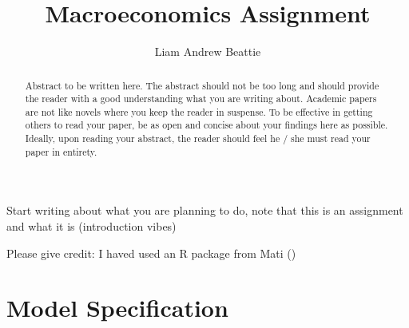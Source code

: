 \documentclass[11pt,preprint]{elsarticle}
\numberwithin{equation}{section}
\numberwithin{figure}{section}
\numberwithin{table}{section}
\begin{document}
\begin{frontmatter}  %

\title{Macroeconomics Assignment}





\author[Add1]{Liam Andrew Beattie}





\address[Add1]{Macroeconomics 871, Stellenbosch University, South
Africa}


\begin{abstract}
\small{
Abstract to be written here. The abstract should not be too long and
should provide the reader with a good understanding what you are writing
about. Academic papers are not like novels where you keep the reader in
suspense. To be effective in getting others to read your paper, be as
open and concise about your findings here as possible. Ideally, upon
reading your abstract, the reader should feel he / she must read your
paper in entirety.
}
\end{abstract}

\vspace{1cm}





\vspace{0.5cm}

\end{frontmatter}

\setcounter{footnote}{0}



\pagestyle{fancy}
\chead{}
\rhead{}
\lfoot{}
\lhead{}
\cfoot{}


\headsep 35pt %




Start writing about what you are planning to do, note that this is an
assignment and what it is (introduction vibes)

Please give credit: I haved used an R package from Mati
()

\section{Model Specification}\label{model-specification}
\end{document}
